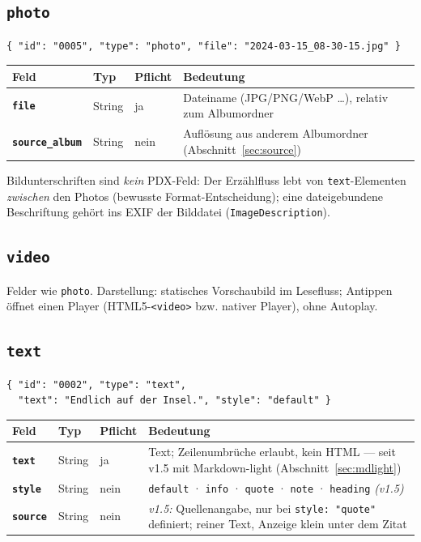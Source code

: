 \documentclass[11pt,a4paper]{article}
\let\mpdtt\texttt
\renewcommand{\texttt}[1]{\mpdtt{\textcolor{mpdred}{#1}}}
\newcommand{\feld}[1]{\mpdtt{\textbf{\textcolor{mpdred}{#1}}}}
\newcommand{\kopf}[1]{\textbf{#1}}
\begin{document}
\subsection{\texttt{photo}}

\begin{lstlisting}
{ "id": "0005", "type": "photo", "file": "2024-03-15_08-30-15.jpg" }
\end{lstlisting}

\begin{tabularx}{\linewidth}{|l|l|l|L|}
\hline
{}\kopf{Feld} & \kopf{Typ} & \kopf{Pflicht} & \kopf{Bedeutung} \\
\hline
\feld{file} & String & ja & Dateiname (JPG/PNG/WebP …), relativ zum Albumordner \\
\feld{source\_album} & String & nein & Auflösung aus anderem Albumordner (Abschnitt~\ref{sec:source}) \\
\hline
\end{tabularx}

Bildunterschriften sind \emph{kein} PDX-Feld: Der Erzählfluss lebt von
\texttt{text}-Elementen \emph{zwischen} den Photos (bewusste
Format-Entscheidung); eine dateigebundene Beschriftung gehört ins EXIF
der Bilddatei (\texttt{ImageDescription}).

\subsection{\texttt{video}}

Felder wie \texttt{photo}. Darstellung: statisches Vorschaubild im
Lesefluss; Antippen öffnet einen Player (HTML5-\texttt{<video>} bzw.
nativer Player), ohne Autoplay.

\subsection{\texttt{text}}

\begin{lstlisting}
{ "id": "0002", "type": "text",
  "text": "Endlich auf der Insel.", "style": "default" }
\end{lstlisting}

\begin{tabularx}{\linewidth}{|l|l|l|L|}
\hline
{}\kopf{Feld} & \kopf{Typ} & \kopf{Pflicht} & \kopf{Bedeutung} \\
\hline
\feld{text} & String & ja & Text; Zeilenumbrüche erlaubt, kein HTML — seit v1.5 mit Markdown-light (Abschnitt~\ref{sec:mdlight}) \\
\feld{style} & String & nein & \texttt{default} · \texttt{info} · \texttt{quote} · \texttt{note} · \texttt{heading} \emph{(v1.5)} \\
\feld{source} & String & nein & \emph{v1.5:} Quellenangabe, nur bei \texttt{style: "quote"} definiert; reiner Text, Anzeige klein unter dem Zitat \\
\hline
\end{tabularx}
\end{document}
